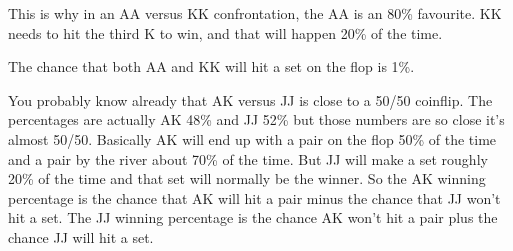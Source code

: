 This is why in an AA versus KK confrontation, the AA is an 80\%
favourite. KK needs to hit the third K to win, and that will happen
20\% of the time.

The chance that both AA and KK will hit a set on the flop is 1\%.

You probably know already that AK versus JJ is close to a 50/50 coinflip.
The percentages are actually AK 48\% and JJ 52\% but those numbers are so
close it's almost 50/50. Basically AK will end up with a pair on the
flop 50\% of the time and a pair by the river about 70\% of the
time. But JJ will make a set roughly 20\% of the time and that set
will normally be the winner. So the AK winning percentage is the
chance that AK will hit a pair minus the chance that JJ won't hit a
set. The JJ winning percentage is the chance AK won't hit a pair plus
the chance JJ will hit a set.



